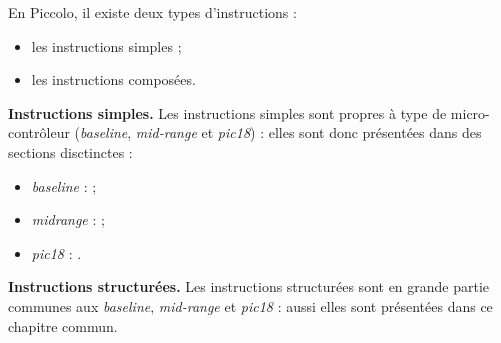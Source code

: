 
\cleardoublepage


\thispagestyle{empty}

En Piccolo, il existe deux types d'instructions :
\begin{itemize}
  \item les instructions simples ;
  \item les instructions composées.
\end{itemize}

\textbf{Instructions simples.} Les instructions simples sont propres à type de micro-contrôleur (\emph{baseline}, \emph{mid-range} et \emph{pic18}) : elles sont donc présentées dans des sections disctinctes :
\begin{itemize}
  \item \emph{baseline} :  ;
  \item \emph{midrange} :  ;
  \item \emph{pic18} : .
\end{itemize}


\textbf{Instructions structurées.} Les instructions structurées sont en grande partie communes aux \emph{baseline}, \emph{mid-range} et \emph{pic18} : aussi elles sont présentées dans ce chapitre commun.

